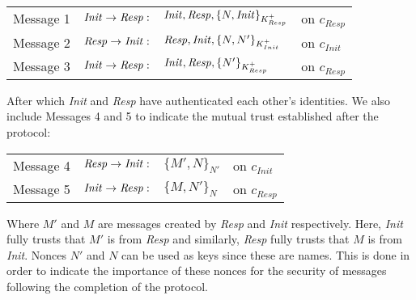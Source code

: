 \documentclass[10pt,a4paper,final,oneside,fleqn]{book}
\begin{document}
\begin{tabular}{llll}
Message 1&\hspace{5mm}$\mbox{{\itshape Init\/}}\to\mbox{{\itshape Resp\/}}:$&$\mbox{{\itshape Init\/}},\mbox{{\itshape Resp\/}},\{N,\mbox{{\itshape Init\/}}\}_{K^+_{Resp}}$&on $c_{Resp}$\\
Message 2&\hspace{5mm}$\mbox{{\itshape Resp\/}}\to\mbox{{\itshape Init\/}}:$&$\mbox{{\itshape Resp\/}},\mbox{{\itshape Init\/}},\{N,N'\}_ {K^+_{Init}}$&on $c_{Init}$\\
Message 3&\hspace{5mm}$\mbox{{\itshape Init\/}}\to\mbox{{\itshape Resp\/}}:$&$\mbox{{\itshape Init\/}},\mbox{{\itshape Resp\/}},\{N'\}_{K^+_{Resp}}$&on $c_{Resp}$
\end{tabular}\vspace{5mm}

\noindent
After which {\itshape Init\/} and {\itshape Resp\/} have authenticated each other's identities.  We also include Messages 4 and 5 to indicate the mutual trust established after the protocol:\vspace{5mm}


\begin{tabular}{llll}
Message 4&\hspace{5mm}$\mbox{{\itshape Resp\/}}\to\mbox{{\itshape Init\/}}:$&$\{M',N\}_{N'}$&on $c_{Init}$\\
Message 5&\hspace{5mm}$\mbox{{\itshape Init\/}}\to\mbox{{\itshape Resp\/}}:$&$\{M,N'\}_{N}$&on $c_{Resp}$
\end{tabular}\vspace{5mm}

\noindent
Where $M'$ and $M$ are messages created by {\itshape Resp\/} and {\itshape Init\/} respectively.  Here, {\itshape Init\/} fully trusts that $M'$ is from {\itshape Resp\/} and similarly, {\itshape Resp\/} fully trusts that $M$ is from {\itshape Init\/}.  Nonces $N'$ and $N$ can be used as keys since these are names.  This is done in order to indicate the importance of these nonces for the security of messages following the completion of the protocol.
\end{document}
